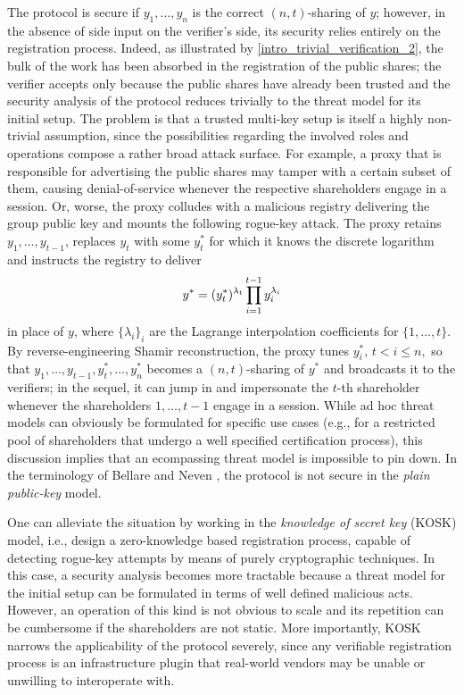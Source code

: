 \documentclass[10pt, psamsfonts, reqno]{amsart}
\theoremstyle{definition}
\theoremstyle{remark}
\numberwithin{equation}{section}
\begin{document}
\noindent
The protocol is secure
if $y_1, \dots, y_n$ is the correct $(n, t)$-sharing of $y$;
however, in the absence of side input
on the verifier's side,
its security relies entirely on the registration process.
Indeed, as illustrated by \eqref{intro_trivial_verification_2},
the bulk of the work has been
absorbed in the registration of the public shares;
the verifier accepts only because
the public shares have already been trusted
and the security analysis of the protocol
reduces trivially to the threat model for its initial setup.
The problem is that
a trusted multi-key setup is itself
a highly non-trivial assumption,
since the possibilities regarding
the involved roles and operations
compose a rather broad attack surface.
For example, a proxy that is responsible
for advertising the public shares
may tamper with a certain subset of them,
causing denial-of-service whenever
the respective shareholders engage
in a session.
Or, worse, the proxy colludes with
a malicious registry delivering the group public key
and mounts the following rogue-key attack.
The proxy retains $y_1, \dots, y_{t-1}$, replaces
$y_t$ with some $y_t^*$ for which it knows the discrete logarithm
and instructs the registry to deliver
\vspace{5pt}
\begin{equation*}
y^* = (y_t^*)^{\lambda_t}\prod_{i=1}^{t-1}y_i^{\lambda_i}
\vspace{5pt}
\end{equation*}
in place of $y$, where $\{\lambda_i\}_{i}$
are the Lagrange interpolation coefficients for $\{1, \dots, t\}$.
By reverse-engineering Shamir reconstruction,
the proxy tunes $y_i^*,\hspace{2pt} t < i \le n,$
so that $y_1, \dots, y_{t-1}, y_t^*, \dots, y_n^*$
becomes a $(n, t)$-sharing of $y^*$
and broadcasts it to the verifiers;
in the sequel, it can jump in and
impersonate the $t$-th shareholder
whenever the shareholders $1, \dots, t-1$ engage
in a session.
While ad hoc threat models can obviously be formulated
for specific use cases (e.g., for a restricted pool of
shareholders that undergo a well specified certification process),
this discussion implies that
an ecompassing threat model is impossible to pin down.
In the terminology of Bellare and Neven \cite{paper_bellare_musig},
the protocol is not secure
in the \textit{plain public-key} model.

One can alleviate the situation by working in the
\textit{knowledge of secret key} (KOSK) model,
i.e., design a zero-knowledge based registration process,
capable of detecting rogue-key attempts
by means of purely cryptographic techniques.
In this case, a security analysis becomes more tractable
because a threat model for the initial setup can be
formulated in terms of well defined malicious acts.
However, an operation of this kind is not obvious to scale
and its repetition can be cumbersome
if the shareholders are not static.
More importantly, KOSK narrows
the applicability of the protocol severely,
since any verifiable registration process
is an infrastructure plugin that real-world vendors
may be unable or unwilling to interoperate with.
\end{document}
